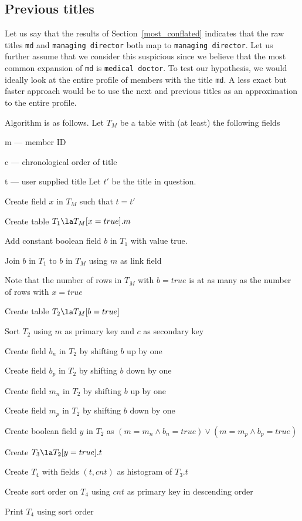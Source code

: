 \ee

\subsection{Previous titles}
\label{previous_titles}

Let us say that the results of Section~\ref{most_conflated} indicates
that the raw titles \verb+md+ and \verb+managing director+ both map to
\verb+managing director+. Let us further assume that we consider this
suspicious since we believe that the most common expansion of \verb+md+
is \verb+medical doctor+. To test our hypothesis, we would ideally look 
at the entire profile of members with the title \verb+md+. A less exact
but faster approach would be to use the next and previous
titles as an approximation to the entire profile.

Algorithm is as follows. Let \(T_M\) be a table with (at least) the 
following fields
\be
\item m --- member ID
\item c --- chronological order of title
\item t --- user supplied title
\ee
Let \(t'\) be the title in question.
\be
\item Create field  \(x\) in \(T_M\) such that \(t = t'\)
\item Create table \(T_1 \la T_M[x=true].m\)
\item Add constant boolean field \(b\) in \(T_1\) with value true.
\item Join \(b\) in \(T_1\) to \(b\) in \(T_M\) using \(m\) as link
field
\item Note that the number of rows in \(T_M\) with \(b = true\) is at
as many as the number of rows with \(x = true\)
\item Create table \(T_2 \la T_M[b=true]\)
\item Sort \(T_2\) using \(m\) as primary key and \(c\) as secondary key
\item Create field \(b_n\) in \(T_2\) by shifting \(b\) up by one
\item Create field \(b_p\) in \(T_2\) by shifting \(b\) down by one
\item Create field \(m_n\) in \(T_2\) by shifting \(b\) up by one
\item Create field \(m_p\) in \(T_2\) by shifting \(b\) down by one
\item Create boolean field \(y\) in \(T_2\) as \(
(m = m_n \wedge b_n = true) \vee (m = m_p \wedge b_p = true) \)
\item Create \(T_3 \la T_2[y=true].t\)
\item Create \(T_4\) with fields \((t, cnt)\) as histogram of \(T_3.t\)
\item Create sort order on \(T_4\) using \(cnt\) as primary key in
  descending order
\item Print \(T_4\) using sort order
\ee
